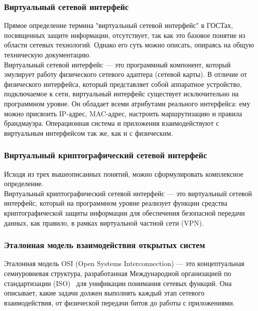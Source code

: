 \subsubsection{Виртуальный сетевой интерфейс}
Прямое определение термина "виртуальный сетевой интерфейс" в ГОСТах, посвященных защите информации, отсутствует, так как это базовое понятие из области сетевых технологий.
Однако его суть можно описать, опираясь на общую техническую документацию.\\

Виртуальный сетевой интерфейс — это программный компонент, который эмулирует работу физического сетевого адаптера (сетевой карты).
В отличие от физического интерфейса, который представляет собой аппаратное устройство, подключаемое к сети, виртуальный интерфейс существует исключительно на программном уровне.
Он обладает всеми атрибутами реального интерфейса: ему можно присвоить IP-адрес, MAC-адрес, настроить маршрутизацию и правила брандмауэра.
Операционная система и приложения взаимодействуют с виртуальным интерфейсом так же, как и с физическим.

\subsubsection{Виртуальный криптографический сетевой интерфейс}
Исходя из трех вышеописанных понятий, можно сформулировать комплексное определение.\\

Виртуальный криптографический сетевой интерфейс — это виртуальный сетевой интерфейс, который на программном уровне реализует функции средства криптографической защиты информации для обеспечения безопасной передачи данных, как правило, в рамках виртуальной частной сети (VPN).

\subsubsection{Эталонная модель взаимодействия открытых систем}
Эталонная модель OSI (Open Systems Interconnection) — это концептуальная семиуровневая структура, разработанная Международной организацией по стандартизации (ISO)~\cite[c. 28]{iso_7498_1} для унификации понимания сетевых функций.
Она описывает, какие задачи должен выполнять каждый этап сетевого взаимодействия, от физической передачи битов до работы с приложениями.\\

